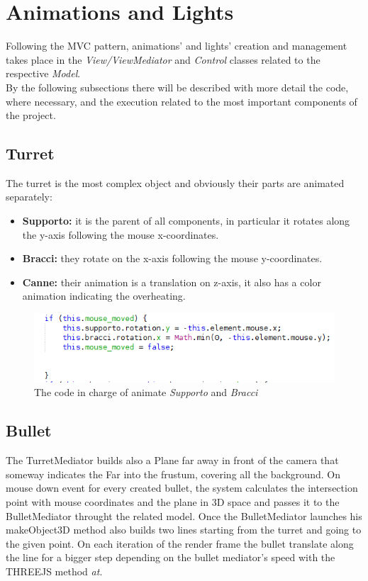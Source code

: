 \section{Animations and Lights}
Following the MVC pattern, animations' and lights' creation and management takes place in the \textit{View/ViewMediator} and \textit{Control} classes related to the respective \textit{Model}.\\
By the following subsections there will be described with more detail the code, where necessary, and the execution related to the most important components of the project.
\subsection{Turret}
The turret is the most complex object and obviously their parts are animated separately:
\begin{itemize}
\item \textbf{Supporto: } it is the parent of all components, in particular it rotates along the y-axis following the mouse x-coordinates.
\item \textbf{Bracci: } they rotate on the x-axis following the mouse y-coordinates.
\item \textbf{Canne: } their animation is a translation on z-axis, it also has a color animation indicating the overheating.
\end{itemize}
\begin{figure}[h!]
\begin{center}
\includegraphics[scale=0.35]{images/supporto_bracci_anim.png}
\caption{The code in charge of animate \textit{Supporto} and \textit{Bracci}}
\end{center}
\end{figure}
\subsection{Bullet}
The TurretMediator builds also a Plane far away in front of the camera that someway indicates the Far into the frustum, covering all the background.
On mouse down event for every created bullet, the system calculates the intersection point with mouse coordinates and the plane in 3D space and passes it to the BulletMediator throught the related model. Once the BulletMediator launches his makeObject3D method also builds two lines starting from the turret and going to the given point. On each iteration of the render frame the bullet translate along the line for a bigger step depending on the bullet mediator's speed with the THREEJS method \textit{at}.
